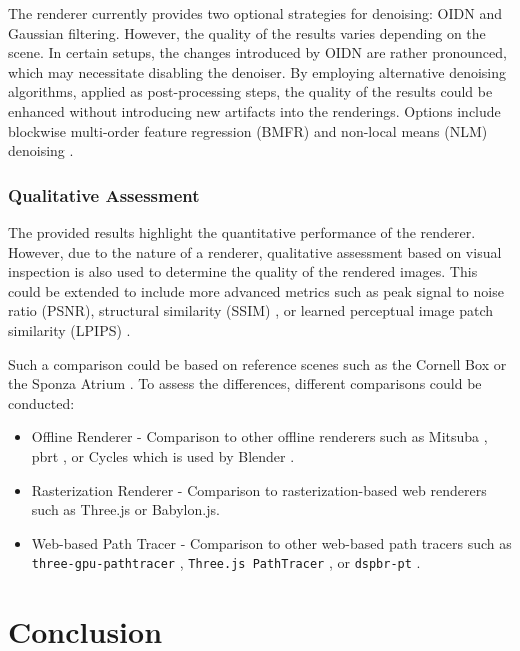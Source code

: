 The renderer currently provides two optional strategies for denoising: \gls{OIDN} \cite{openImageDenoise} and Gaussian filtering. However, the quality of the results varies depending on the scene. In certain setups, the changes introduced by \gls{OIDN} are rather pronounced, which may necessitate disabling the denoiser. By employing alternative denoising algorithms, applied as post-processing steps, the quality of the results could be enhanced without introducing new artifacts into the renderings. Options include blockwise multi-order feature regression (BMFR) \cite{blockwise-multi-order-regresssion-for-rt-pt} and non-local means (NLM) denoising \cite{buadesNLMDenoising}.

\subsubsection*{Qualitative Assessment}

The provided results highlight the quantitative performance of the renderer. However, due to the nature of a renderer, qualitative assessment based on visual inspection is also used to determine the quality of the rendered images. This could be extended to include more advanced metrics such as peak signal to noise ratio (PSNR), structural similarity (SSIM) \cite{ssim}, or learned perceptual image patch similarity (LPIPS) \cite{lpips}.

Such a comparison could be based on reference scenes such as the Cornell Box \cite{goral1984modeling} or the Sponza Atrium \cite{dabrovic2002sponza}. To assess the differences, different comparisons could be conducted:

\begin{itemize}
    \item{Offline Renderer} - Comparison to other offline renderers such as Mitsuba \cite{Jakob2020DrJit}, \gls{pbrt} \cite{Pharr_Physically_Based_Rendering_2023}, or Cycles which is used by \gls{Blender} \cite{cycles}.
    \item{Rasterization Renderer} - Comparison to rasterization-based web renderers such as \gls{Three.js} or \gls{Babylon.js}.
    \item{Web-based Path Tracer} - Comparison to other web-based path tracers such as \texttt{three-gpu-pathtracer} \cite{ThreeJsPathTracerJohnson}, \texttt{Three.js PathTracer} \cite{ThreeJsPathTracerLoftis}, or \texttt{dspbr-pt} \cite{PathTracerDassault}.
\end{itemize}

\section{Conclusion}

